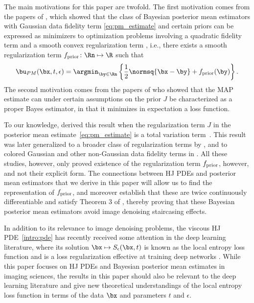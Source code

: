 The main motivations for this paper are twofold. The first motivation comes from the papers of \cite{louchet2008modeles,gribonval2011should,louchet2013posterior}, which showed that the class of Bayesian posterior mean estimators with Gaussian data fidelity term \eqref{eq:pm_estimate} and certain priors can be expressed as minimizers to optimization problems involving a quadratic fidelity term and a smooth convex regularization term \cite{louchet2008modeles,gribonval2011should,gribonval2013reconciling,gribonval2018characterization,gribonval2018bayesian}, i.e., there exists a smooth regularization term $f_{\rm{prior}}\colon \Rn \mapsto \R$ such that
\[
\bu_{PM}(\bx,t,\epsilon) = \argmin_{\by \in \Rn} \left\{\frac{1}{2}\normsq{\bx-\by} + f_{\rm{prior}}(\by)\right\}.
\]
The second motivation comes from the papers of \cite{burger2014maximum,burger2016bregman,pereyra2019revisiting} who showed that the MAP estimate can under certain assumptions on the prior $J$ be characterized as a proper Bayes estimator, in that it minimizes in expectation a loss function.


To our knowledge, \cite{louchet2008modeles,louchet2013posterior} derived this result when the regularization term $J$ in the posterior mean estimate~\eqref{eq:pm_estimate} is a total variation term~\cite{rudin1992nonlinear}. This result was later generalized to a broader class of regularization terms by \citet{gribonval2011should}, and to colored Gaussian and other non-Gaussian data fidelity terms in \cite{gribonval2013reconciling,gribonval2018bayesian}. All these studies, however, only proved existence of the regularization term $f_{\rm{prior}}$, however, and not their explicit form. The connections between HJ PDEs and posterior mean estimators that we derive in this paper will allow us to find the representation of $f_{\rm{prior}}$, and moreover establish that these are twice continuously differentiable and satisfy Theorem 3 of \citet{nikolova2004weakly}, thereby proving that these Bayesian posterior mean estimators avoid image denoising staircasing effects.

In addition to its relevance to image denoising problems, the viscous HJ PDE~\eqref{intro:pde} has recently received some attention in the deep learning literature, where its solution $\bx \mapsto S_\epsilon(\bx,t)$ is known as the local entropy loss function and is a loss regularization effective at training deep networks \cite{chaudhari2018deep,chaudhari2019entropy,garcia2019variational,vidal2017mathematics}. While this paper focuses on HJ PDEs and Bayesian posterior mean estimates in imaging sciences, the results in this paper should also be relevant to the deep learning literature and give new theoretical understandings of the local entropy loss function in terms of the data $\bx$ and parameters $t$ and $\epsilon$.

